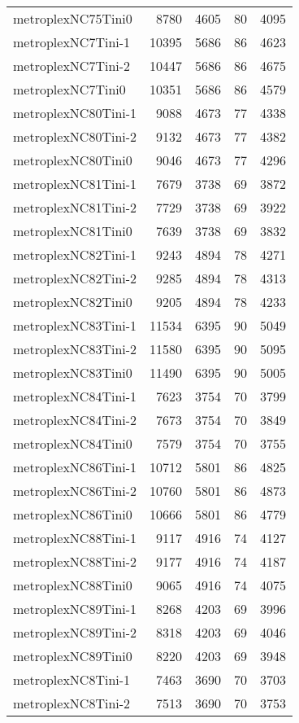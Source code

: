 \begin{longtable}{lrrrr}
metroplexNC75Tini0 & 8780 & 4605 & 80 & 4095 \\
metroplexNC7Tini-1 & 10395 & 5686 & 86 & 4623 \\
metroplexNC7Tini-2 & 10447 & 5686 & 86 & 4675 \\
metroplexNC7Tini0 & 10351 & 5686 & 86 & 4579 \\
metroplexNC80Tini-1 & 9088 & 4673 & 77 & 4338 \\
metroplexNC80Tini-2 & 9132 & 4673 & 77 & 4382 \\
metroplexNC80Tini0 & 9046 & 4673 & 77 & 4296 \\
metroplexNC81Tini-1 & 7679 & 3738 & 69 & 3872 \\
metroplexNC81Tini-2 & 7729 & 3738 & 69 & 3922 \\
metroplexNC81Tini0 & 7639 & 3738 & 69 & 3832 \\
metroplexNC82Tini-1 & 9243 & 4894 & 78 & 4271 \\
metroplexNC82Tini-2 & 9285 & 4894 & 78 & 4313 \\
metroplexNC82Tini0 & 9205 & 4894 & 78 & 4233 \\
metroplexNC83Tini-1 & 11534 & 6395 & 90 & 5049 \\
metroplexNC83Tini-2 & 11580 & 6395 & 90 & 5095 \\
metroplexNC83Tini0 & 11490 & 6395 & 90 & 5005 \\
metroplexNC84Tini-1 & 7623 & 3754 & 70 & 3799 \\
metroplexNC84Tini-2 & 7673 & 3754 & 70 & 3849 \\
metroplexNC84Tini0 & 7579 & 3754 & 70 & 3755 \\
metroplexNC86Tini-1 & 10712 & 5801 & 86 & 4825 \\
metroplexNC86Tini-2 & 10760 & 5801 & 86 & 4873 \\
metroplexNC86Tini0 & 10666 & 5801 & 86 & 4779 \\
metroplexNC88Tini-1 & 9117 & 4916 & 74 & 4127 \\
metroplexNC88Tini-2 & 9177 & 4916 & 74 & 4187 \\
metroplexNC88Tini0 & 9065 & 4916 & 74 & 4075 \\
metroplexNC89Tini-1 & 8268 & 4203 & 69 & 3996 \\
metroplexNC89Tini-2 & 8318 & 4203 & 69 & 4046 \\
metroplexNC89Tini0 & 8220 & 4203 & 69 & 3948 \\
metroplexNC8Tini-1 & 7463 & 3690 & 70 & 3703 \\
metroplexNC8Tini-2 & 7513 & 3690 & 70 & 3753 \\

\end{longtable}
